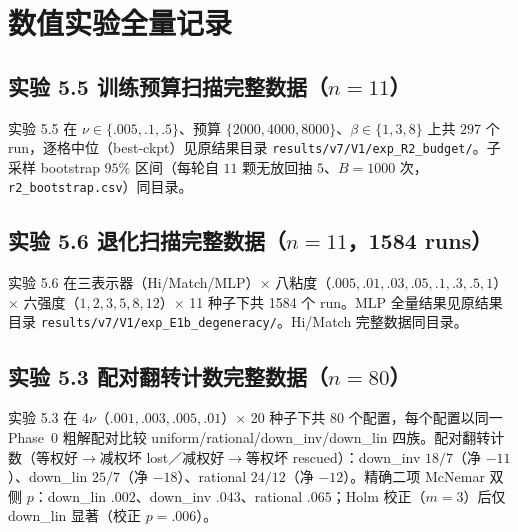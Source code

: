 \documentclass[fontset=windows,11pt]{ctexart}
\numberwithin{equation}{section}
\begin{document}
\FloatBarrier
\normalsize\setlength{\tabcolsep}{6pt}
\section{数值实验全量记录}\label{app:tables}

\subsection{实验 5.5 训练预算扫描完整数据（$n=11$）}

实验 5.5 在 $\nu\in\{.005,.1,.5\}$、预算 $\{2000,4000,8000\}$、$\beta\in\{1,3,8\}$ 上共 $297$ 个 run，逐格中位（best-ckpt）见原结果目录 \texttt{results/\hspace{0pt}v7/\hspace{0pt}V1/\hspace{0pt}exp\_\hspace{0pt}R2\_\hspace{0pt}budget/\hspace{0pt}}。子采样 bootstrap $95\%$ 区间（每轮自 $11$ 颗无放回抽 $5$、$B=1000$ 次，\texttt{r2\_\hspace{0pt}bootstrap.csv}）同目录。

\subsection{实验 5.6 退化扫描完整数据（$n=11$，1584 runs）}

实验 5.6 在三表示器（Hi/Match/MLP）$\times$ 八粘度（$.005,\allowbreak .01,\allowbreak .03,\allowbreak .05,\allowbreak .1,\allowbreak .3,\allowbreak .5,\allowbreak 1$）$\times$ 六强度（$1,\allowbreak 2,\allowbreak 3,\allowbreak 5,\allowbreak 8,\allowbreak 12$）$\times$ 11 种子下共 1584 个 run。MLP 全量结果见原结果目录 \texttt{results/\hspace{0pt}v7/\hspace{0pt}V1/\hspace{0pt}exp\_\hspace{0pt}E1b\_\hspace{0pt}degeneracy/\hspace{0pt}}。Hi/Match 完整数据同目录。

\subsection{实验 5.3 配对翻转计数完整数据（$n=80$）}

实验 5.3 在 4$\nu$（$.001,.003,.005,.01$）$\times$ 20 种子下共 80 个配置，每个配置以同一 Phase~0 粗解配对比较 uniform/rational/down\_inv/down\_lin 四族。配对翻转计数（等权好$\to$减权坏 lost／减权好$\to$等权坏 rescued）：down\_inv $18/7$（净 $-11$）、down\_lin $25/7$（净 $-18$）、rational $24/12$（净 $-12$）。精确二项 McNemar 双侧 $p$：down\_lin $.002$、down\_inv $.043$、rational $.065$；Holm 校正（$m=3$）后仅 down\_lin 显著（校正 $p=.006$）。
\end{document}
